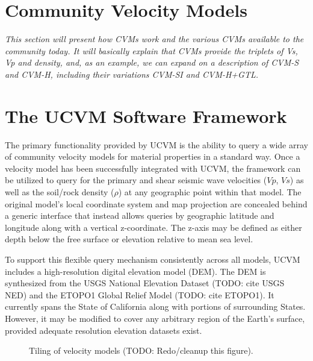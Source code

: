 


\section{Community Velocity Models}
\label{sec:cvms}

\textit{
\color{blue}
This section will present how CVMs work and the various CVMs available to the community today. It will basically explain that CVMs provide the triplets of Vs, Vp and density, and, as an example, we can expand on a description of CVM-S and CVM-H, including their variations CVM-SI and CVM-H+GTL.
}

\section{The UCVM Software Framework}\label{sec:ucvm}
The primary functionality provided by UCVM is the ability to query a wide array of community velocity models for material properties in a standard way. Once a velocity model has been successfully integrated with UCVM, the framework can be utilized to query for the primary and shear seismic wave velocities ($Vp$, $Vs$) as well as the soil/rock density ($\rho$) at any geographic point within that model. The original model's local coordinate system and map projection are concealed behind a generic interface that instead allows queries by geographic latitude and longitude along with a vertical z-coordinate. The z-axis may be defined as either depth below the free surface or elevation relative to mean sea level.

To support this flexible query mechanism consistently across all models, UCVM includes a high-resolution digital elevation model (DEM). The DEM is synthesized from the USGS National Elevation Dataset (TODO: cite USGS NED) and the ETOPO1 Global Relief Model (TODO: cite ETOPO1). It currently spans the State of California along with portions of surrounding States. However, it may be modified to cover any arbitrary region of the Earth's surface, provided adequate resolution elevation datasets exist.
\begin{figure}
\centering
{}
\caption{Tiling of velocity models (TODO: Redo/cleanup this figure).}\label{fig:tiling}
\end{figure}

